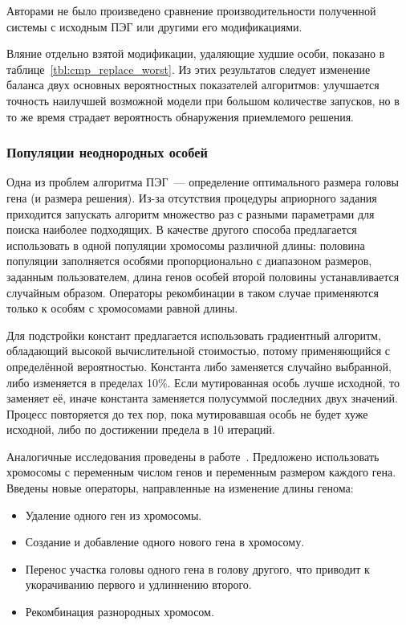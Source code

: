 Авторами не было произведено сравнение производительности полученной системы с исходным ПЭГ или другими его модификациями.

Вляние отдельно взятой модификации, удаляющие худшие особи, показано в таблице~\ref{tbl:cmp_replace_worst}. Из этих результатов следует изменение баланса двух основных вероятностных показателей алгоритмов: улучшается точность наилучшей возможной модели при большом количестве запусков, но в то же время страдает вероятность обнаружения приемлемого решения.




\subsubsection{Популяции неоднородных особей}

Одна из проблем алгоритма ПЭГ~--- определение оптимального размера головы гена (и размера решения). Из-за отсутствия процедуры априорного задания приходится запускать алгоритм множество раз с разными параметрами для поиска наиболее подходящих. В качестве другого способа предлагается~\cite{Lopes:2004:AMCS} использовать в одной популяции хромосомы различной длины: половина популяции заполняется особями пропорционально с диапазоном размеров, заданным пользователем, длина генов особей второй половины устанавливается случайным образом. Операторы рекомбинации в таком случае применяются только к особям с хромосомами равной длины.

Для подстройки констант предлагается использовать градиентный алгоритм, обладающий высокой вычислительной стоимостью, потому применяющийся с определённой вероятностью. Константа либо заменяется случайно выбранной, либо изменяется в пределах 10\%. Если мутированная особь лучше исходной, то заменяет её, иначе константа заменяется полусуммой последних двух значений. Процесс повторяется до тех пор, пока мутировавшая особь не будет хуже исходной, либо по достижении предела в 10 итераций.

Аналогичные исследования проведены в работе~\cite{journals/acisc/BrowneS10}. Предложено использовать хромосомы с переменным числом генов и переменным размером каждого гена. Введены новые операторы, направленные на изменение длины генома:
\begin{itemize} \itemsep0pt \parskip0pt 
  \item Удаление одного ген из хромосомы.
  \item Создание и добавление одного нового гена в хромосому.
  \item Перенос участка головы одного гена в голову другого, что приводит к укорачиванию первого и удлиннению второго.
  \item Рекомбинация разнородных хромосом.
\end{itemize}


